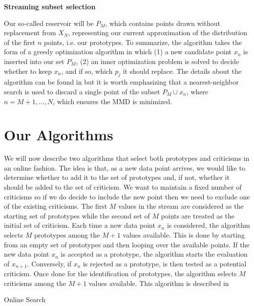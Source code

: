 \documentclass{article}
\begin{document}
	\textbf{Streaming subset selection}
	
	Our so-called reservoir will be $P_M$, which contains points drawn without replacement from $X_N$, representing our current approximation of the distribution of the first $n$ points, i.e. our prototypes. To summarize, the algorithm takes the form of a greedy optimization algorithm in which (1) a new candidate point $x_n$ is inserted into our set $P_M$, (2) an inner optimization problem is solved to decide whether to keep $x_n$, and if so, which $p_j$ it should replace. The details about the algorithm can be found in \cite{streaming} but it is worth emphasizing that a nearest-neighbor search is used to discard a single point of the subset $P_M \cup x_n$, where ${n = M+1, \ldots, N}$, which ensures the MMD is minimized. 
	
	
	\section{Our Algorithms}
	We will now describe two algorithms that select both prototypes and criticisms in an online fashion. The idea is that, as a new data point arrives, we would like to determine whether to add it to the set of prototypes and, if not, whether it should be added to the set of criticism. We want to maintain a fixed number of criticisms so if we do decide to include the new point then we need to exclude one of the existing criticisms. 
	The first $M$ values in the stream are considered as the starting set of prototypes while the second set of $M$ points are treated as the initial set of criticism. Each time a new data point $x_n$ is considered, the algorithm selects $M$ prototypes among the $M+1$ values available. This is done by starting from an empty set of prototypes and then looping over the available points. If the new data point $x_n$ is accepted as a prototype, the algorithm starts the evaluation of $x_{n+1}$. Conversely, if $x_n$ is rejected as a prototype, is then tested as a potential criticism. Once done for the identification of prototypes, the algorithm selects $M$ criticisms among the $M+1$ values available. This algorithm is described in 
	
	\begin{algorithm}
		\caption{Online Search}\label{online_greedy}
		\begin{algorithmic}[1]
			\EndIf
			\EndFor\\
			
		\end{algorithmic}
	\end{algorithm}
	
\end{document}
